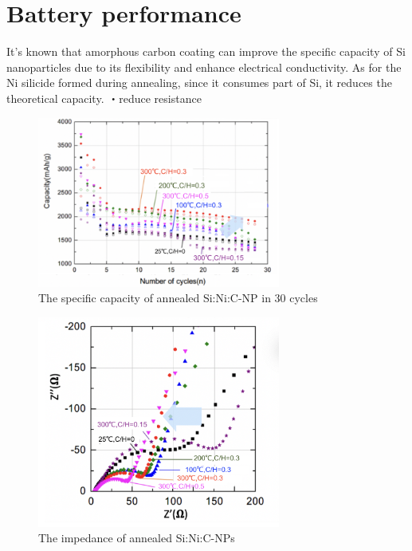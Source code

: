  \section{Battery performance}
 It's known that amorphous carbon coating can improve the specific capacity of Si nanoparticles due to its flexibility and enhance electrical conductivity. As for the Ni silicide formed during annealing, since it consumes part of Si, it reduces the theoretical capacity. 
・reduce resistance
\begin{figure}[H]
\centering
\includegraphics[width=8cm]{src/fig/fig51.png}
\caption{The specific capacity of annealed Si:Ni:C-NP in 30 cycles}
\end{figure}
\begin{figure}[H]
\centering
\includegraphics[width=8cm]{src/fig/fig52.png}
\caption{The impedance of annealed Si:Ni:C-NPs}
\end{figure}

